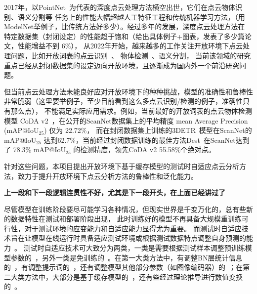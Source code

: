 \documentclass[12pt]{article}
\newcommand{\myEmph}[1]{\textbf{\textcolor[rgb]{0,0,0.25}{#1}}}
\begin{document}
2017年，以PointNet~\cite{qi17pointnet,qi17pointnet2}为代表的深度点云处理方法横空出世，它们在点云物体识别、语义分割等
任务上的性能大幅超越人工特征工程和传统机器学习方法，（用ModelNet举例子，比传统方法好多少）。经过多年的发展，深度点云处理方法在
特定数据集（封闭设定）的性能趋于饱和（给出具体例子+图表，发表了多少篇论文，性能增益不到 6\%），
从2022年开始，越来越多的工作关注开放环境下点云处理问题，比如开放词表的点云识别~\cite{zhang22pointclip,zhu23pointclip2,xue23ulip,xue24ulip2,liu23openshape,zhou24uni3d}、
物体检测~\cite{zeng23clip2,zhu23pointclip2,lu23ov3det,cao23coda,yang24imov3d,cao25codav2}、语义分割，
当前该领域的研究重点已经从封闭数据集的设定迈向开放环境，且逐渐成为国内外一个前沿研究问题。

但当前点云处理方法未能良好应对开放环境下的种种挑战，模型的准确性和鲁棒性非常脆弱（这里要举例子，至少目前看到这么多点云识别/检测的例子，准确性只有那么点），
不能满足实际应用需求。例如，当前最好的开放词表的点云物体检测模型 CoDA v2~\cite{cao25codav2}，在公开的ScanNet数据集上的平均精度 mean Average Precision (mAP@IoU$_{25}$) 仅为 22.72\%，
而在封闭数据集上训练的3DETR~\cite{misra213detr}模型在ScanNet的 mAP@IoU$_{25}$ 达到62.7\%，当前经过封闭数据训练的最佳方法Dest~\cite{wang25dest}在ScanNet达到了 78.3\% mAP@IoU$_{25}$ 的检测精度，领先CoDA v2 55.58\%个绝对点。

针对这些问题，本项目提出开放环境下基于缓存模型的测试时自适应点云分析方法，致力于提升开放环境下点云分析方法的鲁棒性和泛化能力。

\myEmph{上一段和下一段逻辑连贯性不好，尤其是下一段开头，在上面已经讲过了}

尽管模型在训练阶段要尽可能学习各种情况，但现实世界是千变万化的，总有些新的数据特性在测试和部署阶段出现，
此时训练好的模型不再具备大规模重训练可行性，对于测试环境的应变能力和自适应能力显得尤为重要。
而测试时自适应技术旨在让模型在线运行时具备适应测试环境或根据测试数据特点调整自身预测的能力~\cite{yeo23rna}。
测试时自适应技术可大致分为两类，一类是需要根据测试样本调整预训练模型参数的~\cite{schneider20improving,wang21tent,zhang21adaptive,zhang22memo,shu22tpt,feng23difftpt,niu23towards,chen22adacontrastive,zhao2024rlcf}，另外一类是免训练的~\cite{wang24bftt3d,karmanov24tda,zanella24meanshift,farina24zero,sun25pointcache,tamjidi2025uniadapter}。在第一大类方法中，有调整BN层统计信息的~\cite{schneider20improving,wang21tent,zhang22memo}，有调整提示词的~\cite{shu22tpt,feng23difftpt}，还有调整模型其他部分参数（如图像编码器）的~\cite{zhang21adaptive,chen22adacontrastive,zhao2024rlcf}；在第二大类方法中，大部分是基于缓存模型的~\cite{wang24bftt3d,karmanov24tda,sun25pointcache,tamjidi2025uniadapter}，还有些经过理论推导进行数值变换的~\cite{zanella24meanshift,farina24zero}。
\end{document}
